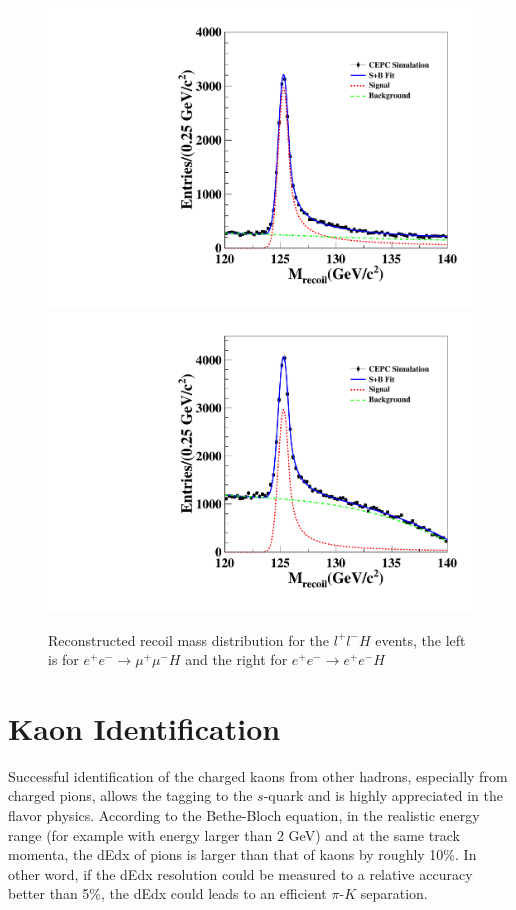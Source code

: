 \begin{figure}[h!]
\centering
\includegraphics[scale=0.30]{Figures/Performance/zhenxing/DataRooFitPlotmd.pdf}
\includegraphics[scale=0.30]{Figures/Performance/zhenxing/DataRooFitPlotmi.pdf}
\caption{Reconstructed recoil mass distribution for the $l^+l^-H$ events, the left is for $e^+e^- \to \mu^+\mu^-H$ and the right for  $e^+e^- \to e^+e^-H$  }
\label{fig:performance-llrecoil}
\end{figure}

\section{Kaon Identification}

Successful identification of the charged kaons from other hadrons,
especially from charged pions, allows the tagging to the $s$-quark and is highly appreciated in the flavor physics.
According to the Bethe-Bloch equation, in the realistic energy range
(for example with energy larger than 2 GeV) and at the same track momenta,
the dEdx of pions is larger than that of kaons by roughly 10\%.
In other word, if the dEdx resolution could be measured to a relative accuracy better than 5\%,
the dEdx could leads to an efficient $\pi$-$K$ separation.

